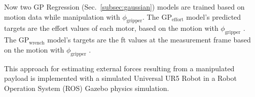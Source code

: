      
    Now two GP Regression (Sec.~\ref{subsec:gaussian}) models are trained based on motion data while manipulation with \(\phi_{\text{gripper}}\). The \(\text{GP}_{\text{effort}}\) model's predicted targets are the effort values of each motor, based on the motion with \(\phi_{\text{gripper}}\) \cite{kurdas2022online, urrea2018parameter}. The \(\text{GP}_{\text{wrench}}\) model's targets are the ft values at the measurement frame based on the motion with \(\phi_{\text{gripper}}\) \cite{kurdas2022online, urrea2018parameter}.

    This approach for estimating external forces resulting from a manipulated payload is implemented with a simulated Universal UR5 Robot \cite{ur5_robot} in a Robot Operation System (ROS) \cite{ros_official} Gazebo \cite{gazebo_ros} physics simulation.